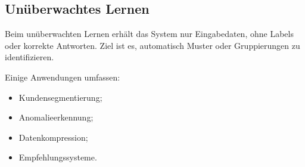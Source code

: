 \subsection{Unüberwachtes Lernen}

Beim unüberwachten Lernen erhält das System nur Eingabedaten, ohne Labels
oder korrekte Antworten. Ziel ist es, automatisch Muster oder Gruppierungen zu identifizieren.

Einige Anwendungen umfassen:

\begin{itemize}
    \item Kundensegmentierung;
    \item Anomalieerkennung;
    \item Datenkompression;
    \item Empfehlungssysteme.
\end{itemize} 